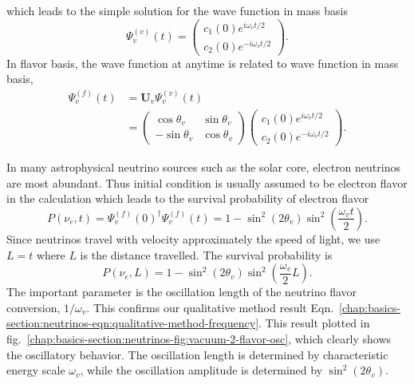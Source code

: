 which leads to the simple solution for the wave function in mass basis
\begin{equation}
\Psi_v^{(v)}(t) = \begin{pmatrix}
c_1(0) e^{i \omega_v t/2 } \\
c_2(0) e^{ -i\omega_v t/2 } 
\end{pmatrix}.
\end{equation}
In flavor basis, the wave function at anytime is related to wave function in mass basis,
\begin{align}
\Psi_v^{(f)}(t) &= \mathbf{U}_v\Psi_v^{(v)}(t) \\
& = \begin{pmatrix} \cos\theta_v & \sin \theta_v \\ -\sin \theta_v & \cos \theta_v \end{pmatrix} \begin{pmatrix} c_1(0) e^{i\omega_v t/2 } \\
c_2(0) e^{ -i\omega_v t/2 }    \end{pmatrix} .
\end{align}

In many astrophysical neutrino sources such as the solar core, electron neutrinos are most abundant. Thus initial condition is usually assumed to be electron flavor in the calculation which leads to the survival probability of electron flavor
\begin{equation}
P(\nu_e,t) = \Psi_v^{(f)}(0)^\dagger \Psi_v^{(f)}(t) = 1-\sin^2(2\theta_v)\sin^2\left( \frac{\omega_v t}{2} \right).
\end{equation}
Since neutrinos travel with velocity approximately the speed of light, we use $L = t$ where $L$ is the distance travelled. The survival probability is
\begin{equation}
P(\nu_e,L) =  1-\sin^2(2\theta_v)\sin^2\left( \frac{\omega_v}{2} L \right).
\end{equation}
The important parameter is the oscillation length of the neutrino flavor conversion, $1/\omega_v$. This confirms our qualitative method result Eqn.~\ref{chap:basics-section:neutrinos-eqn:qualitative-method-frequency}. This result plotted in fig.~\ref{chap:basics-section:neutrinos-fig:vacuum-2-flavor-osc}, which clearly shows the oscillatory behavior. The oscillation length is determined by characteristic energy scale $\omega_v$, while the oscillation amplitude is determined by $\sin^2(2\theta_v)$.

